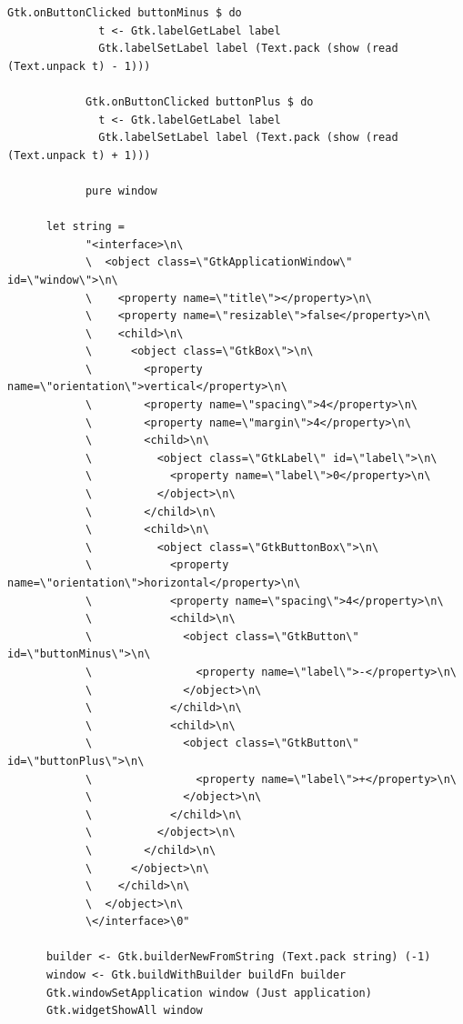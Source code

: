 \documentclass[UdineBachThesis,american,11pt]{PhdThesis}
\begin{document}
  \begin{lstlisting}[gobble=4,basicstyle=\ttfamily\small]
            Gtk.onButtonClicked buttonMinus $ do
              t <- Gtk.labelGetLabel label
              Gtk.labelSetLabel label (Text.pack (show (read (Text.unpack t) - 1)))

            Gtk.onButtonClicked buttonPlus $ do
              t <- Gtk.labelGetLabel label
              Gtk.labelSetLabel label (Text.pack (show (read (Text.unpack t) + 1)))

            pure window

      let string =
            "<interface>\n\
            \  <object class=\"GtkApplicationWindow\" id=\"window\">\n\
            \    <property name=\"title\"></property>\n\
            \    <property name=\"resizable\">false</property>\n\
            \    <child>\n\
            \      <object class=\"GtkBox\">\n\
            \        <property name=\"orientation\">vertical</property>\n\
            \        <property name=\"spacing\">4</property>\n\
            \        <property name=\"margin\">4</property>\n\
            \        <child>\n\
            \          <object class=\"GtkLabel\" id=\"label\">\n\
            \            <property name=\"label\">0</property>\n\
            \          </object>\n\
            \        </child>\n\
            \        <child>\n\
            \          <object class=\"GtkButtonBox\">\n\
            \            <property name=\"orientation\">horizontal</property>\n\
            \            <property name=\"spacing\">4</property>\n\
            \            <child>\n\
            \              <object class=\"GtkButton\" id=\"buttonMinus\">\n\
            \                <property name=\"label\">-</property>\n\
            \              </object>\n\
            \            </child>\n\
            \            <child>\n\
            \              <object class=\"GtkButton\" id=\"buttonPlus\">\n\
            \                <property name=\"label\">+</property>\n\
            \              </object>\n\
            \            </child>\n\
            \          </object>\n\
            \        </child>\n\
            \      </object>\n\
            \    </child>\n\
            \  </object>\n\
            \</interface>\0"

      builder <- Gtk.builderNewFromString (Text.pack string) (-1)
      window <- Gtk.buildWithBuilder buildFn builder
      Gtk.windowSetApplication window (Just application)
      Gtk.widgetShowAll window
  \end{lstlisting}
\end{document}
